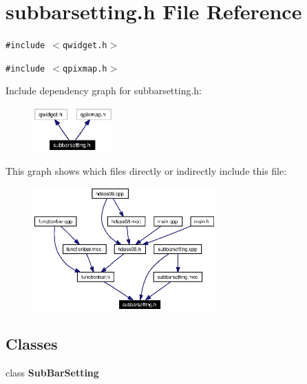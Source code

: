 \section{subbarsetting.h File Reference}
\label{subbarsetting_8h}


{\tt \#include $<$qwidget.h$>$}\par
{\tt \#include $<$qpixmap.h$>$}\par


Include dependency graph for subbarsetting.h:\begin{figure}[H]
\begin{center}
\leavevmode
\includegraphics[width=87pt]{subbarsetting_8h__incl}
\end{center}
\end{figure}


This graph shows which files directly or indirectly include this file:\begin{figure}[H]
\begin{center}
\leavevmode
\includegraphics[width=199pt]{subbarsetting_8h__dep__incl}
\end{center}
\end{figure}
\subsection*{Classes}
\begin{CompactItemize}
\item 
class {\bf Sub\-Bar\-Setting}
\end{CompactItemize}
